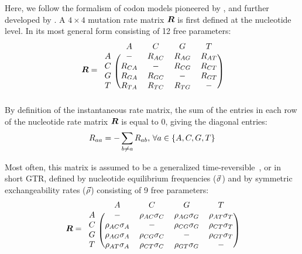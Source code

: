 Here, we follow the formalism of codon models pioneered by \citet{Muse1994}, and further developed by \citet{Nielsen1998}.
A $4 \times 4$ mutation rate matrix $\bm{R}$ is first defined at the nucleotide level.
In its most general form consisting of 12 free parameters:
\begin{equation}
    \label{eq:mutrates}
    \Mutmatrix =
    \begin{blockarray}{ccccc}
        & A & C & G & T \\
        \begin{block}{c(cccc)}
            A & - & {\mutmatrix_{AC}} & {\mutmatrix_{AG}} & {\mutmatrix_{AT}} \\
            C & {\mutmatrix_{CA}} &                 - & {\mutmatrix_{CG}} & {\mutmatrix_{CT}} \\
            G & {\mutmatrix_{GA}} & {\mutmatrix_{GC}} &                 - & {\mutmatrix_{GT}} \\
            T & {\mutmatrix_{TA}} & {\mutmatrix_{TC}} & {\mutmatrix_{TG}} & - \\
        \end{block}
    \end{blockarray}
\end{equation}
By definition of the instantaneous rate matrix, the sum of the entries in each row of the nucleotide rate matrix $\bm{R}$ is equal to $0$, giving the diagonal entries:
\begin{equation}
    R_{aa} = - \sum\limits_{ b \neq a} R_{ab}\text{, } \forall a \in \{A,C,G,T\}
\end{equation}

Most often, this matrix is assumed to be a generalized time-reversible~\citep{Tavare1986}, or in short \acrshort{GTR}, defined by nucleotide equilibrium frequencies ($\vec{\sigma}$) and by symmetric exchangeability rates ($\vec{\rho}$) consisting of 9 free parameters:
\begin{equation}
    \label{eq:mutrates-GTR}
    \Mutmatrix =
    \begin{blockarray}{ccccc}
        & A & C & G & T \\
        \begin{block}{c(cccc)}
            A & - & {\exchan_{AC}\mutequi_C} & {\exchan_{AG}\mutequi_G} & {\exchan_{AT}\mutequi_T} \\
            C & {\exchan_{AC}\mutequi_A} &                        - & {\exchan_{CG}\mutequi_G} & {\exchan_{CT}\mutequi_T} \\
            G & {\exchan_{AG}\mutequi_A} & {\exchan_{CG}\mutequi_C} &                        - & {\exchan_{GT}\mutequi_T} \\
            T & {\exchan_{AT}\mutequi_A} & {\exchan_{CT}\mutequi_C} & {\exchan_{GT}\mutequi_G} & - \\
        \end{block}
    \end{blockarray}
\end{equation}

